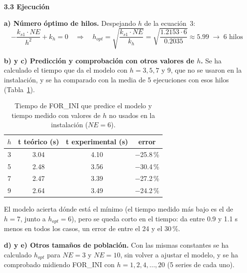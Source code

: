 \documentclass[12pt]{article}
\begin{document}
\begin{enumerate}
\medskip
\noindent\textbf{3.3 Ejecución}\par
\smallskip

\textbf{a) Número óptimo de hilos.} Despejando $h$ de la ecuación~3:
\[
-\frac{k_{s1} \cdot NE}{h^2} + k_h = 0 \quad\Rightarrow\quad h_{opt} = \sqrt{\frac{k_{s1} \cdot NE}{k_h}} = \sqrt{\frac{1.2153 \cdot 6}{0.2035}} \approx 5.99 \;\rightarrow\; 6 \text{ hilos}
\]

\textbf{b) y c) Predicción y comprobación con otros valores de $h$.} Se ha calculado el tiempo que da el modelo con $h = 3, 5, 7$ y 9, que no se usaron en la instalación, y se ha comparado con la media de 5 ejecuciones con esos hilos (Tabla~\ref{tab:c3_prediccion}).

\begin{table}[htbp]
\centering
\begin{tabular}{c|ccc}
\toprule
\textbf{$h$} & \textbf{t teórico (s)} & \textbf{t experimental (s)} & \textbf{error} \\
\midrule
3 & 3.04 & 4.10 & $-$25.8\,\% \\
5 & 2.48 & 3.56 & $-$30.4\,\% \\
7 & 2.47 & 3.39 & $-$27.2\,\% \\
9 & 2.64 & 3.49 & $-$24.2\,\% \\
\bottomrule
\end{tabular}
\caption{Tiempo de FOR\_INI que predice el modelo y tiempo medido con valores de $h$ no usados en la instalación ($NE = 6$).}
\label{tab:c3_prediccion}
\end{table}

El modelo acierta dónde está el mínimo (el tiempo medido más bajo es el de $h = 7$, junto a $h_{opt} = 6$), pero se queda corto en el tiempo: da entre 0.9 y 1.1 s menos en todos los casos, un error de entre el 24 y el 30\,\%.

\textbf{d) y e) Otros tamaños de población.} Con las mismas constantes se ha calculado $h_{opt}$ para $NE = 3$ y $NE = 10$, sin volver a ajustar el modelo, y se ha comprobado midiendo FOR\_INI con $h = 1, 2, 4, \dots, 20$ (5 series de cada uno).


\end{enumerate}
\end{document}
